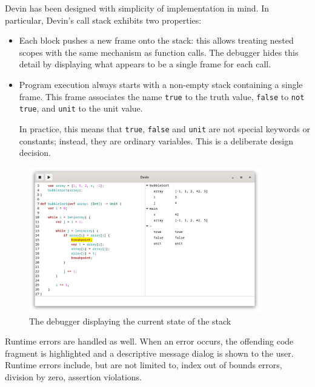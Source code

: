 \documentclass[UdineBachThesis,american,11pt]{PhdThesis}
\begin{document}
  Devin has been designed with simplicity of implementation in mind. In
  particular, Devin's call stack exhibits two properties:

  \begin{itemize}
    \item Each block pushes a new frame onto the stack: this allows treating
    nested scopes with the same mechanism as function calls. The debugger hides
    this detail by displaying what appears to be a single frame for each call.

    \item Program execution always starts with a non-empty stack containing a
    single frame. This frame associates the name \mbox{\texttt{true}} to the
    truth value, \mbox{\texttt{false}} to \mbox{\texttt{not true}}, and
    \mbox{\texttt{unit}} to the unit value.

    In practice, this means that \mbox{\texttt{true}}, \mbox{\texttt{false}} and
    \mbox{\texttt{unit}} are not special keywords or constants; instead, they
    are ordinary variables. This is a deliberate design decision.
  \end{itemize}

  \begin{figure}[H]
    \centering
    \includegraphics[width=0.9\textwidth]{5.png}
    \caption{The debugger displaying the current state of the stack}
    \label{figure:debugger}
  \end{figure}

  \pagebreak

  Runtime errors are handled as well. When an error occurs, the offending code
  fragment is highlighted and a descriptive message dialog is shown to the user.
  Runtime errors include, but are not limited to, index out of bounds errors,
  division by zero, assertion violations.
\end{document}
